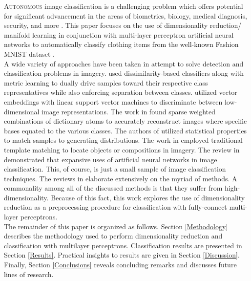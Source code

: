 \documentclass[conference]{IEEEtran}
\begin{document}
\lettrine{A}{utonomous} image classification is a challenging problem which offers potential for significant advancement in the areas of biometrics, biology, medical diagnosis, security, and more \cite{Prasad2015Review,Lu2007Review}.  This paper focuses on the use of dimensionality reduction/ manifold learning in conjunction with multi-layer perceptron artificial neural networks to automatically classify clothing items from the well-known Fashion MNIST dataset \cite{Xiao2017FashionMNIST}.  \\
\indent A wide variety of approaches have been taken in attempt to solve detection and classification problems in imagery.  \cite{Mensink2013KNN} used dissimilarity-based classifiers along with metric learning to dually drive samples toward their respective class representatives while also enforcing separation between classes.  \cite{Sanchez2011svm,Lin2011svm} utilized vector embeddings with linear support vector machines to discriminate between low-dimensional image representations.  The work in \cite{Shao2019DictionaryLearning} found sparse weighted combinations of dictionary atoms to accurately reconstruct images where specific bases equated to the various  classes.  The authors of \cite{Timofte2013NaiveBayes} utilized statistical properties to match samples to generating distributions.  The work in \cite{Swaroop2016TemplateMatching} employed traditional template matching to locate objects or compositions in imagery.  The review in \cite{Driss2017MLPandCNN} demonstrated that expansive uses of artificial neural networks in image classification.  This, of course, is just a small sample of image classification techniques.  The reviews in \cite{Prasad2015Review,Lu2007Review} elaborate extensively on the myriad of methods.  A commonality among all of the discussed methods is that they suffer from high-dimensionality.  Because of this fact, this work explores the use of dimensionality reduction as a preprocessing procedure for classification with fully-connect multi-layer perceptrons. \\
\indent The remainder of this paper is organized as follows.  Section \ref{Methodology} describes the methodology used to perform dimensionality reduction and classification with multilayer perceptrons.  Classification results are presented in Section \ref{Results}.  Practical insights to results are given in Section \ref{Discussion}.  Finally, Section \ref{Conclusions} reveals concluding remarks and discusses future lines of research.


\end{document}
